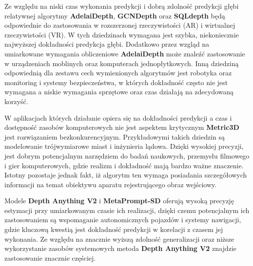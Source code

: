 Ze względu na niski czas wykonania predykcji i dobrą zdolność predykcji głębi relatywnej algorytmy \textbf{AdelaiDepth}, \textbf{GCNDepth} oraz \textbf{SQLdepth} będą odpowiednie do zastosowania w rozszerzonej rzeczywistości (AR) i wirtualnej rzeczywistości (VR). W tych dziedzinach wymagana jest szybka, niekoniecznie najwyższej dokładności predykcja głębi. Dodatkowo przez wzgląd na umiarkowane wymagania obliczeniowe \textbf{AdelaiDepth} może znaleźć zastosowanie w urządzeniach moblinych oraz komputerach jednopłytkowych. Inną dziedziną odpowiednią dla zestawu cech wymienionych algorytmów jest robotyka oraz monitoring i systemy bezpieczeństwa, w których dokładność często nie jest wymagana a niskie wymagania sprzętowe oraz czas działają na zdecydowaną korzyść.

W aplikacjach których działanie opiera się na dokładności predykcji a czas i dostępność zasobów komputerowych nie jest aspektem krytycznym \textbf{Metric3D} jest rozwiązaniem bezkonkurencyjnym. Przykładowymi takich dziedzin są modelowanie trójwymiarowe miast i inżynieria lądowa. Dzięki wysokiej precyzji, jest dobrym potencjalnym narzędziem do badań naukowych, przemysłu filmowego i gier komputerowych, gdzie realizm i dokładność mają bardzo ważne znaczenie. Istotny pozostaje jednak fakt, iż algorytm ten wymaga posiadania szczegółowych informacji na temat obiektywu aparatu rejestrującego obraz wejściowy.

Modele \textbf{Depth Anything V2} i \textbf{MetaPrompt-SD} oferują wysoką precyzję estymacji przy umiarkowanym czasie ich realizacji, dzięki czemu potencjalnym ich zastosowaniem są wspomaganie autonomicznych pojazdów i systemy nawigacji, gdzie kluczową kwestią jest dokładność predykcji w korelacji z czasem jej wykonania. Ze względu na znacznie wyższą zdolność generalizacji oraz niższe wykorzystanie zasobów systemowych metoda \textbf{Depth Anything V2} znajdzie zastosowanie znacznie częściej.